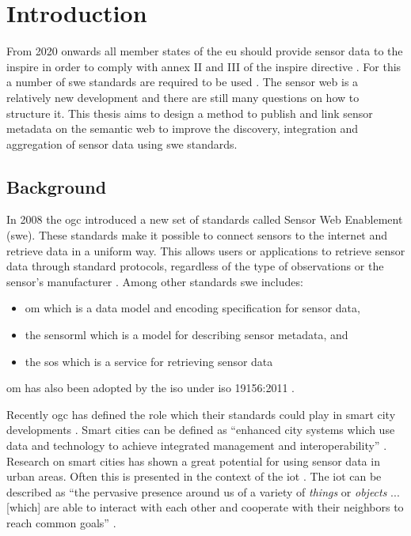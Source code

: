 

\chapter{Introduction}
\label{chap:introduction}
From 2020 onwards all member states of the \ac{eu} should provide sensor data to the \ac{inspire} in order to comply with annex II and III of the \ac{inspire} directive \citep{SDI:INSPIRE5}. For this a number of \ac{swe} standards are required to be used \citep{SDI:INSPIRE2}. The sensor web is a relatively new development and there are still many questions on how to structure it. This thesis aims to design a method to publish and link sensor metadata on the semantic web to improve the discovery, integration and aggregation of sensor data using \ac{swe} standards.


\section{Background}
In 2008 the \ac{ogc} introduced a new set of standards called Sensor Web Enablement (\ac{swe}). These standards make it possible to connect sensors to the internet and retrieve data in a uniform way. This allows users or applications to retrieve sensor data through standard protocols, regardless of the type of observations or the sensor's manufacturer \citep{SW:Botts}. Among other standards \ac{swe} includes:
\begin{itemize}
	\item \acf{om} which is a data model and encoding specification for sensor data,
	\item the \acf{sensorml} which is a model for describing sensor metadata, and
	\item the \acf{sos} which is a service for retrieving sensor data \citep{SW:OGC}
\end{itemize}
\ac{om} has also been adopted by the \ac{iso} under \ac{iso} 19156:2011 \citep{SW:ISO}. 

Recently \ac{ogc} has defined the role which their standards could play in smart city developments \citep{SC:OGC}. Smart cities can be defined as \enquote{enhanced city systems which use data and technology to achieve integrated management and interoperability} \citep[p. 18]{SC:Moir}. Research on smart cities has shown a great potential for using sensor data in urban areas. Often this is presented in the context of the \ac{iot} \citep{IOT:Zanelli, SSW:Wang2}. The \ac{iot} can be described as \enquote{the pervasive presence around us of a variety of \textit{things} or \textit{objects} ... [which] are able to interact with each other and cooperate with their neighbors to reach common goals} \cite[p. 2787]{IOT:Atzori}. 

